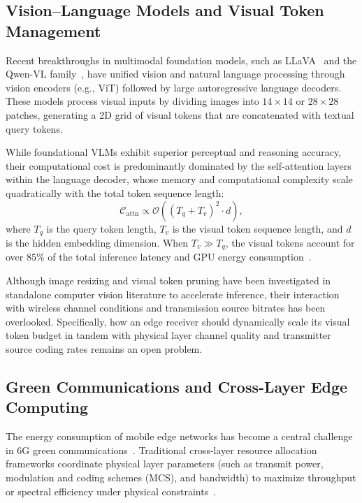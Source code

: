 \subsection{Vision--Language Models and Visual Token Management}
Recent breakthroughs in multimodal foundation models, such as LLaVA~\cite{liu2023llava} and the Qwen-VL family~\cite{wang2024qwen2vl,bai2025qwen25vl}, have unified vision and natural language processing through vision encoders (e.g., ViT) followed by large autoregressive language decoders. These models process visual inputs by dividing images into $14\times 14$ or $28\times 28$ patches, generating a 2D grid of visual tokens that are concatenated with textual query tokens.

While foundational VLMs exhibit superior perceptual and reasoning accuracy, their computational cost is predominantly dominated by the self-attention layers within the language decoder, whose memory and computational complexity scale quadratically with the total token sequence length:
\begin{equation}
\mathcal{C}_{\mathrm{attn}} \propto \mathcal{O}\left((T_q + T_v)^2 \cdot d\right),
\end{equation}
where $T_q$ is the query token length, $T_v$ is the visual token sequence length, and $d$ is the hidden embedding dimension. When $T_v \gg T_q$, the visual tokens account for over $85\%$ of the total inference latency and GPU energy consumption~\cite{sabanovic2026inarvl}.

Although image resizing and visual token pruning have been investigated in standalone computer vision literature to accelerate inference, their interaction with wireless channel conditions and transmission source bitrates has been overlooked. Specifically, how an edge receiver should dynamically scale its visual token budget in tandem with physical layer channel quality and transmitter source coding rates remains an open problem.

\subsection{Green Communications and Cross-Layer Edge Computing}
The energy consumption of mobile edge networks has become a central challenge in 6G green communications~\cite{zheng2024aerialee,auer2011howmuch}. Traditional cross-layer resource allocation frameworks coordinate physical layer parameters (such as transmit power, modulation and coding schemes (MCS), and bandwidth) to maximize throughput or spectral efficiency under physical constraints~\cite{cui2005energy}.

